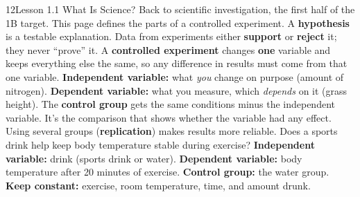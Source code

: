\documentclass[11pt,letterpaper]{article}
\begin{document}
\begin{tbpage}{12}{Lesson 1.1 What Is Science?}
  {Back to scientific investigation, the first half of the 1B target. This page defines the parts of a controlled experiment.}
    {A \textbf{hypothesis} is a testable explanation. Data from experiments either \textbf{support} or \textbf{reject} it; they never ``prove'' it.}
    {A \textbf{controlled experiment} changes \textbf{one} variable and keeps everything else the same, so any difference in results must come from that one variable.}
    {\textbf{Independent variable:} what \emph{you} change on purpose (amount of nitrogen). \textbf{Dependent variable:} what you measure, which \emph{depends} on it (grass height).}
    {The \textbf{control group} gets the same conditions minus the independent variable. It's the comparison that shows whether the variable had any effect. Using several groups (\textbf{replication}) makes results more reliable.}
    {Does a sports drink help keep body temperature stable during exercise? \textbf{Independent variable:} drink (sports drink or water). \textbf{Dependent variable:} body temperature after 20 minutes of exercise. \textbf{Control group:} the water group. \textbf{Keep constant:} exercise, room temperature, time, and amount drunk.}
\end{tbpage}
\end{document}
